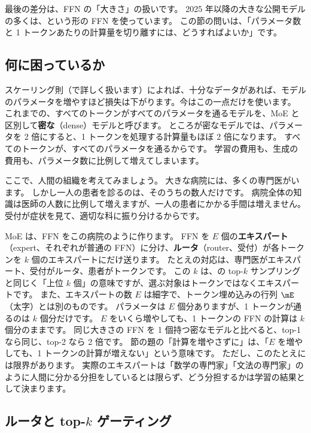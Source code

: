 最後の差分は、FFN の「大きさ」の扱いです。
2025 年以降の大きな公開モデルの多くは、という形の FFN を使っています。
この節の問いは、「パラメータ数と 1 トークンあたりの計算量を切り離すには、どうすればよいか」です。

\subsection*{何に困っているか}

スケーリング則（で詳しく扱います）によれば、十分なデータがあれば、モデルのパラメータを増やすほど損失は下がります。今はこの一点だけを使います。
これまでの、すべてのトークンがすべてのパラメータを通るモデルを、MoE と区別して\textbf{密な}（dense）モデルと呼びます。
ところが密なモデルでは、パラメータを 2 倍にすると、1 トークンを処理する計算量もほぼ 2 倍になります。
すべてのトークンが、すべてのパラメータを通るからです。
学習の費用も、生成の費用も、パラメータ数に比例して増えてしまいます。

ここで、人間の組織を考えてみましょう。
大きな病院には、多くの専門医がいます。
しかし一人の患者を診るのは、そのうちの数人だけです。
病院全体の知識は医師の人数に比例して増えますが、一人の患者にかかる手間は増えません。
受付が症状を見て、適切な科に振り分けるからです。

MoE は、FFN をこの病院のように作ります。
FFN を $E$ 個の\textbf{エキスパート}（expert、それぞれが普通の FFN）に分け、\textbf{ルータ}（router、受付）が各トークンを $k$ 個のエキスパートにだけ送ります。
たとえの対応は、専門医がエキスパート、受付がルータ、患者がトークンです。
この $k$ は、の top-$k$ サンプリングと同じく「上位 $k$ 個」の意味ですが、選ぶ対象はトークンではなくエキスパートです。
また、エキスパートの数 $E$ は細字で、トークン埋め込みの行列 $\mE$（太字）とは別のものです。
パラメータは $E$ 個分ありますが、1 トークンが通るのは $k$ 個分だけです。
$E$ をいくら増やしても、1 トークンの FFN の計算は $k$ 個分のままです。
同じ大きさの FFN を 1 個持つ密なモデルと比べると、top-1 なら同じ、top-2 なら 2 倍です。
節の題の「計算を増やさずに」は、「$E$ を増やしても、1 トークンの計算が増えない」という意味です。
ただし、このたとえには限界があります。
実際のエキスパートは「数学の専門家」「文法の専門家」のように人間に分かる分担をしているとは限らず、どう分担するかは学習の結果として決まります。

\subsection*{ルータと top-$k$ ゲーティング}

